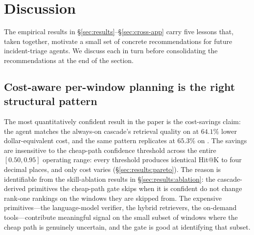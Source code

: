 %

\section{Discussion}
\label{sec:discussion}

The empirical results in \S\ref{sec:results}--\S\ref{sec:cross-app} carry five lessons that, taken together, motivate a small set of concrete recommendations for future incident-triage agents. We discuss each in turn before consolidating the recommendations at the end of the section.

\subsection{Cost-aware per-window planning is the right structural pattern}
\label{sec:discussion:pareto}

The most quantitatively confident result in the paper is the cost-savings claim: the agent matches the always-on cascade's retrieval quality on \dsob{} at $64.1\%$ lower dollar-equivalent cost, and the same pattern replicates at $65.3\%$ on \dsotel{}. The savings are insensitive to the cheap-path confidence threshold across the entire $[0.50, 0.95]$ operating range: every threshold produces identical Hit@K to four decimal places, and only cost varies (\S\ref{sec:results:pareto}). The reason is identifiable from the skill-ablation results in \S\ref{sec:results:ablation}: the cascade-derived primitives the cheap-path gate skips when it is confident do not change rank-one rankings on the windows they are skipped from. The expensive primitives---the language-model verifier, the hybrid retrievers, the on-demand tools---contribute meaningful signal on the small subset of windows where the cheap path is genuinely uncertain, and the gate is good at identifying that subset.

